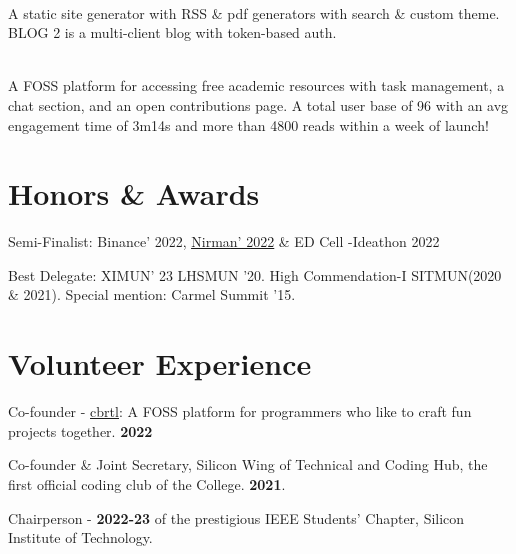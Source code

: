 \documentclass[]{assets/deedy-resume-openfont}
\begin{document}
\hfill {}\\
A static site generator with RSS \& pdf generators with search \& custom theme. BLOG 2 is a multi-client blog with token-based auth. \\
\sectionsep


\hfill {}\\
A FOSS platform for accessing free academic resources with task management, a chat section, and an open contributions page. A total user base of 96 with an avg engagement time of 3m14s and more than 4800 reads within a week of launch!\\

\sectionsep
%
%
\section{Honors \& Awards}
\begin{tightemize}  
\item Semi-Finalist: Binance' 2022, \href{https://nirmansilicon.tech/}{\underline{Nirman' 2022}} \& ED Cell -Ideathon 2022 \\
\item Best Delegate: XIMUN' 23 LHSMUN '20. High Commendation-I SITMUN(2020 \& 2021). Special mention: Carmel Summit '15. \\
\end{tightemize}
\section{Volunteer Experience}
\begin{tightemize} 
\item Co-founder - \underline{\href{https://cbrtl.github.io}{cbrtl}}: A FOSS platform for programmers who like to craft fun projects together. \textbf{2022}\\
\item Co-founder \& Joint Secretary, Silicon Wing of Technical and Coding Hub, the first official coding club of the College. \textbf{2021}.\\
\item Chairperson - \textbf{2022-23} of the prestigious IEEE Students’ Chapter, Silicon Institute of Technology.\\
\end{tightemize}
\ 
\end{document}
